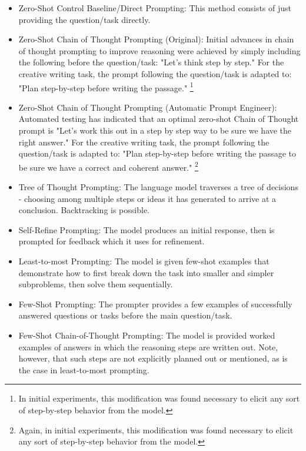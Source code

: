 \documentclass[11pt]{article}
\begin{document}
\begin{itemize}
  \item Zero-Shot Control Baseline/Direct Prompting: This method consists of just providing the question/task directly.
  \item Zero-Shot Chain of Thought Prompting (Original): Initial advances in chain of thought prompting to improve reasoning were achieved by simply including the following before the question/task: "Let's think step by step." \cite{kojima_large_2023} For the creative writing task, the prompt following the question/task is adapted to: "Plan step-by-step before writing the passage." \footnote{In initial experiments, this modification was found necessary to elicit any sort of step-by-step behavior from the model.}
  \item Zero-Shot Chain of Thought Prompting (Automatic Prompt Engineer): Automated testing has indicated that an optimal zero-shot Chain of Thought prompt is "Let's work this out in a step by step way to be sure we have the right answer." \cite{zhou_large_2022} For the creative writing task, the prompt following the question/task is adapted to: "Plan step-by-step before writing the passage to be sure we have a correct and coherent answer." \footnote{Again, in initial experiments, this modification was found necessary to elicit any sort of step-by-step behavior from the model.}
  \item Tree of Thought Prompting: The language model traverses a tree of decisions - choosing among multiple steps or ideas it has generated to arrive at a conclusion. Backtracking is possible. \cite{yao_tree_2023}
  \item Self-Refine Prompting: The model produces an initial response, then is prompted for feedback which it uses for refinement. \cite{madaan_self-refine_2023}
  \item Least-to-most Prompting: The model is given few-shot examples that demonstrate how to first break down the task into smaller and simpler subproblems, then solve them sequentially. \cite{zhou_least--most_2023}
  \item Few-Shot Prompting: The prompter provides a few examples of successfully answered questions or tasks before the main question/task.
  \item Few-Shot Chain-of-Thought Prompting: The model is provided worked examples of answers in which the reasoning steps are written out. \cite{wei_chain--thought_nodate} Note, however, that such steps are not explicitly planned out or mentioned, as is the case in least-to-most prompting.
\end{itemize}
\end{document}
